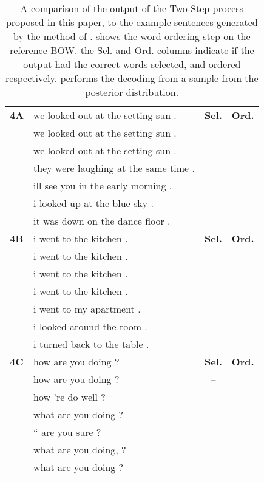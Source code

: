 \documentclass[class=article]{standalone}
\newcommand{\cmark}{\ding{51}}%
\newcommand{\xmark}{\ding{55}}%
\newcommand{\passmark}{--}
\begin{document}
	
	\begin{table*}
		\small
		
		\begin{tabular}{ p{\collenone} p{\collentwo} C{\collenthree} C{\collenthree} }
			
			\textbf{4A \hfill {}}  & we looked out at the setting sun . & \textbf{Sel.} & \textbf{Ord.} \\
			\textbf{\oracletitle}  & we looked out at the setting sun . & \passmark & \cmark \\
			\textbf{\twosteptitle}  & we looked out at the setting sun . & \cmark & \cmark \\
			\textbf{\bm}  & they were laughing at the same time . &  &  \\
			\textbf{}  & ill see you in the early morning . &  &  \\
			\textbf{}  & i looked up at the blue sky . &  &  \\
			\textbf{}  & it was down on the dance floor . &  &  \\
			\hline
			\textbf{4B \hfill {}}  & i went to the kitchen . & \textbf{Sel.} & \textbf{Ord.} \\
			\textbf{\oracletitle}  & i went to the kitchen . & \passmark & \cmark \\
			\textbf{\twosteptitle}  & i went to the kitchen . & \cmark & \cmark \\
			\textbf{\bm}  & i went to the kitchen . &  &  \\
			\textbf{}  & i went to my apartment .  &  &  \\
			\textbf{}  & i looked around the room . &  &  \\
			\textbf{}  & i turned back to the table . &  &  \\
			\hline
			\textbf{4C \hfill {}}  & how are you doing ? & \textbf{Sel.} & \textbf{Ord.} \\
			\textbf{\oracletitle}  & how are you doing ? & \passmark & \cmark \\
			\textbf{\twosteptitle}  & how 're do well ? & \xmark & \xmark \\
			\textbf{\bm}  & what are you doing ? &  &  \\
			\textbf{}  & “ are you sure ? &  &  \\
			\textbf{}  & what are you doing, ? &  &  \\
			\textbf{}  & what are you doing ? &  &  \\
		\end{tabular}
		
		\caption{\label{egbowman} A comparison of the output of the Two Step process proposed in this paper, to the example sentences generated by the method of \textcite{Bowman2015SmoothGeneration}. 
		\oracletitle{}  shows the word ordering step on the reference BOW. the Sel. and Ord. columns indicate if the output had the correct words selected, and ordered respectively. \bs{} performs the decoding from a sample from the posterior distribution.}
	\end{table*}
\end{document}
